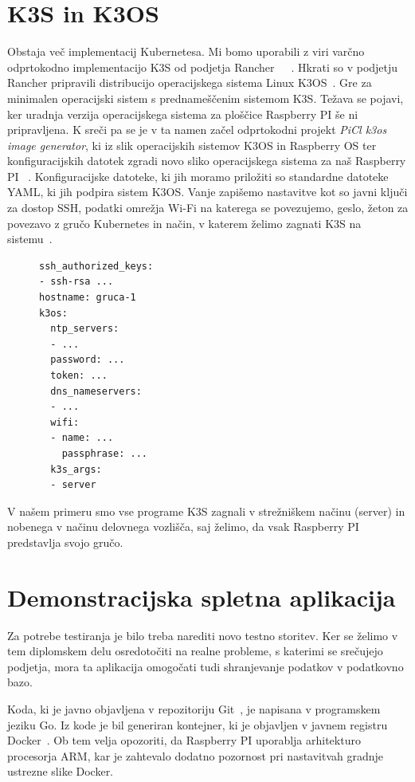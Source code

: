 \documentclass[a4paper, 12pt]{book}
\begin{document}
\section{K3S in K3OS}
Obstaja več implementacij Kubernetesa.
Mi bomo uporabili z viri varčno odprtokodno implementacijo K3S od podjetja Rancher~\cite{k3s-info}~\cite{k8s-performance-comparison}~\cite{low-resource-k8s}.
Hkrati so v podjetju Rancher pripravili distribucijo operacijskega sistema Linux K3OS~\cite{k3os-git}.
Gre za minimalen operacijski sistem s prednameščenim sistemom K3S.
Te\-ža\-va se pojavi, ker uradnja verzija operacijskega sistema za ploščice Raspberry PI še ni pripravljena.
K sreči pa se je v ta namen začel odprtokodni projekt \emph{PiCl k3os image generator}, ki iz slik operacijskih sistemov K3OS in Raspberry OS ter konfiguracijskih datotek zgradi novo sliko operacijskega sistema za naš Raspberry PI ~\cite{k3os-rpi-image-generator}.
Konfiguracijske datoteke, ki jih moramo priložiti so standardne datoteke YAML, ki jih podpira sistem K3OS.
Vanje zapišemo nastavitve kot so javni ključi za dostop SSH, podatki omrežja Wi-Fi na katerega se povezujemo, geslo, žeton za povezavo z gručo Kubernetes in način, v katerem želimo zagnati K3S na sistemu~\cite{k3os-git}.
\begin{figure}[h]
  \begin{verbatim}
ssh_authorized_keys:
- ssh-rsa ...
hostname: gruca-1
k3os:
  ntp_servers:
  - ...
  password: ...
  token: ...
  dns_nameservers:
  - ... 
  wifi:
  - name: ...
    passphrase: ...
  k3s_args:
  - server
\end{verbatim}
\end{figure}

V našem primeru smo vse programe K3S zagnali v strežniškem načinu (server) in nobenega v načinu delovnega vozlišča, saj želimo, da vsak Raspberry PI predstavlja svojo gručo.
\section{Demonstracijska spletna aplikacija}
Za potrebe testiranja je bilo treba narediti novo testno storitev.
Ker se želimo v tem diplomskem delu osredotočiti na realne probleme, s katerimi se srečujejo podjetja, mora ta aplikacija omogočati tudi shranjevanje podatkov v podatkovno bazo.

Koda, ki je javno objavljena v repozitoriju Git~\cite{git-stateful-rest-sample}, je napisana v programskem jeziku Go.
Iz kode je bil generiran kontejner, ki je objavljen v javnem registru Docker~\cite{docker-stateful-rest-sample}.
Ob tem velja opozoriti, da Raspberry PI uporablja arhitekturo procesorja ARM, kar je zahtevalo dodatno pozornost pri nastavitvah gradnje ustrezne slike Docker.
\end{document}
